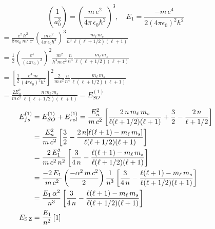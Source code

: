 \documentclass[12pt,fancychapters]{report}
\numberwithin{equation}{section}
\begin{document}
\[
  \left(\frac{1}{a_0^3}\right) = \left(\frac{m\,e^2}{4\pi\,\epsilon_0\hbar^2}\right)^3, \quad 
  E_1 = \frac{-m\,e^4}{2(4\pi\epsilon_0)^2\hbar^2}
\]
\begin{align*}
&= \frac{e^2\,\hbar^2}{8\pi \epsilon_0\,m^2\,c^2}\left(\frac{m\,e^2}{4\pi\,
\epsilon_0\hbar^2}\right)^3\frac{m_\ell\,m_s}{n^3\,\ell(\ell+1/2)(\ell+1)}\qquad\qquad\qquad\qquad
\qquad\qquad\qquad\quad\\
&= \frac{1}{2}\left(\frac{e^4}{(4\pi\epsilon_0)^2}\right)^2\frac{m^2}{\hbar^4m\,c^2}\frac{n}{n^4}
\frac{m_\ell\,m_s}{\ell(\ell+1/2)(\ell+1)}\\
&= \left[\frac{1}{2}\frac{e^4\,m}{(4\pi\epsilon_0)^2\hbar^2}\right]^2\frac{2}{m\,c^2}\frac{n}
{n^4}\frac{m_\ell\,m_s}{\ell(\ell+1/2)(\ell+1)}\\
&= \frac{2E_n^2}{m\,c^2}\frac{n\,m_\ell\,m_s}{\ell(\ell+1/2)(\ell+1)} = E_{SO}^{(1)}
\end{align*}
\begin{align*}
  E_{fs}^{(1)} &= E_{SO}^{(1)}+E_{rel}^{(1)} = \frac{E_n^2}{m\,c^2}\left[\frac{2\,n\,m_\ell\,
  m_s}{\ell(\ell+1/2)(\ell+1)} + \frac{3}{2}-\frac{2\,n}{\ell+1/2}\right]\\
               &= \frac{E_n^2}{m\,c^2}\left[\frac{3}{2} - \frac{2\,n[\ell(\ell + 1)-m_\ell\,m_s]}
               {\ell(\ell+1/2)(\ell+1)}\right]\\
               &= \frac{2\,E_1^2}{m\,c^2\,n^2}\left[\frac{3}{4\,n}-\frac{\ell(\ell+1) - 
               m_\ell\,m_s}{\ell(\ell+1/2)(\ell+1)}\right]\\
               &= \frac{-2\,E_1}{m\,c^2}\left(\frac{-\alpha^2\,m\,c^2}{2}\right)\frac{1}{n^3}
               \left[\frac{3}{4\,n}-\frac{\ell(\ell+1)-m_\ell\,m_s}{\ell(\ell+1/2)(\ell+1)}\right]\\
               &= \frac{E_1\,\alpha^2}{n^3}\left[\frac{3}{4\,n}-\frac{\ell(\ell+1)
               -m_\ell\,m_s}{\ell(\ell+1/2)(\ell+1)} \right]\\
      E_{\text{S\,Z}}&= \frac{E_1}{n^2}\left[1\right]
\end{align*}






 








\newpage 
\end{document}
